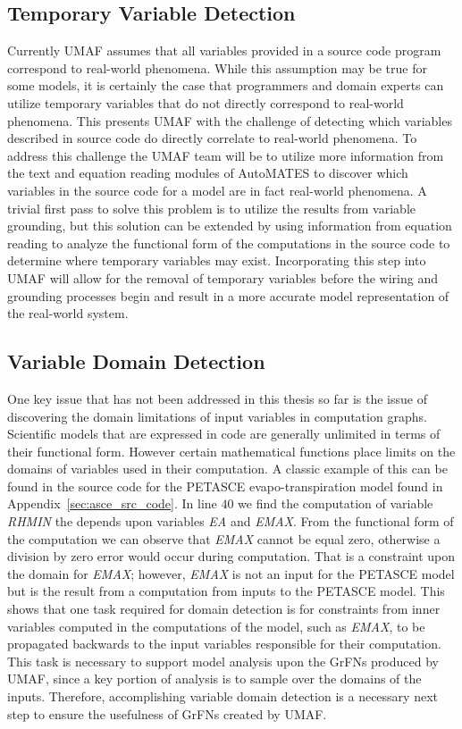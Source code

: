 \subsection{Temporary Variable Detection\label{sec:temp_vars}}
Currently UMAF assumes that all variables provided in a source code program correspond to real-world phenomena.
While this assumption may be true for some models, it is certainly the case that programmers and domain experts can utilize temporary variables that do not directly correspond to real-world phenomena.
This presents UMAF with the challenge of detecting which variables described in source code do directly correlate to real-world phenomena.
To address this challenge the UMAF team will be to utilize more information from the text and equation reading modules of AutoMATES to discover which variables in the source code for a model are in fact real-world phenomena.
A trivial first pass to solve this problem is to utilize the results from variable grounding, but this solution can be extended by using information from equation reading to analyze the functional form of the computations in the source code to determine where temporary variables may exist.
Incorporating this step into UMAF will allow for the removal of temporary variables before the wiring and grounding processes begin and result in a more accurate model representation of the real-world system.

\subsection{Variable Domain Detection\label{sec:var_domain_detection}}
One key issue that has not been addressed in this thesis so far is the issue of discovering the domain limitations of input variables in computation graphs.
Scientific models that are expressed in code are generally unlimited in terms of their functional form.
However certain mathematical functions place limits on the domains of variables used in their computation.
A classic example of this can be found in the source code for the PETASCE evapo-transpiration model found in Appendix~\ref{sec:asce_src_code}.
In line $40$ we find the computation of variable \textit{RHMIN} the depends upon variables \textit{EA} and \textit{EMAX}.
From the functional form of the computation we can observe that \textit{EMAX} cannot be equal zero, otherwise a division by zero error would occur during computation.
That is a constraint upon the domain for \textit{EMAX}; however, \textit{EMAX} is not an input for the PETASCE model but is the result from a computation from inputs to the PETASCE model.
This shows that one task required for domain detection is for constraints from inner variables computed in the computations of the model, such as \textit{EMAX}, to be propagated backwards to the input variables responsible for their computation.
This task is necessary to support model analysis upon the GrFNs produced by UMAF, since a key portion of analysis is to sample over the domains of the inputs.
Therefore, accomplishing variable domain detection is a necessary next step to ensure the usefulness of GrFNs created by UMAF.
